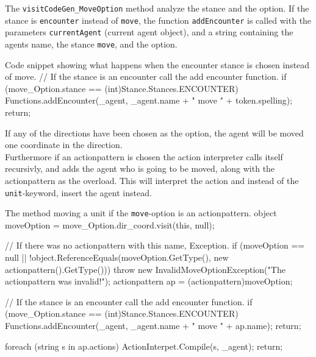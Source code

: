 The \texttt{visitCodeGen\_MoveOption} method analyze the stance and the option. If the stance is \texttt{encounter} instead of \texttt{move}, the function \texttt{addEncounter} is called with the parameters \texttt{currentAgent} (current agent object), and a string containing the agents name, the stance \texttt{move}, and the option.\\

\begin{source}{Code snippet showing what happens when the encounter stance is chosen instead of move.}{}
// If the stance is an encounter call the add encounter function.
if (move_Option.stance == (int)Stance.Stances.ENCOUNTER)
	{
		Functions.addEncounter(_agent, _agent.name + " move " + token.spelling);
		return;
	}
\end{source}

If any of the directions have been chosen as the option, the agent will be moved one coordinate in the direction.\\
Furthermore if an actionpattern is chosen the action interpreter calls itself recursivly, and adds the agent who is going to be moved, along with the actionpattern as the overload. This will interpret the action and instead of the \texttt{unit}-keyword, insert the agent instead.\\

\begin{source}{The method moving a unit if the \texttt{move}-option is an actionpattern.}{}
object moveOption = move_Option.dir_coord.visit(this, null);

// If there was no actionpattern with this name, Exception.
if (moveOption == null || !object.ReferenceEquals(moveOption.GetType(), new actionpattern().GetType()))
	{
		throw new InvalidMoveOptionException("The actionpattern was invalid!");
	}
actionpattern ap = (actionpattern)moveOption;

// If the stance is an encounter call the add encounter function.
if (move_Option.stance == (int)Stance.Stances.ENCOUNTER)
	{
		Functions.addEncounter(_agent, _agent.name + " move " + ap.name);
		return;
	}

foreach (string s in ap.actions)
	{
		ActionInterpet.Compile(s, _agent);
	}
return;
\end{source}